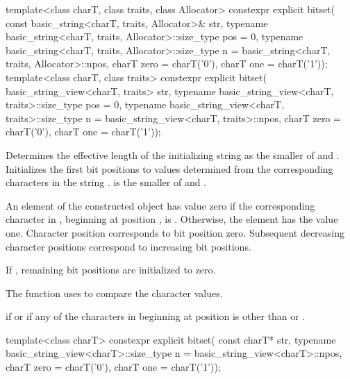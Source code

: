 %
\begin{itemdecl}
template<class charT, class traits, class Allocator>
  constexpr explicit bitset(
    const basic_string<charT, traits, Allocator>& str,
    typename basic_string<charT, traits, Allocator>::size_type pos = 0,
    typename basic_string<charT, traits, Allocator>::size_type n
      = basic_string<charT, traits, Allocator>::npos,
    charT zero = charT('0'),
    charT one = charT('1'));
template<class charT, class traits>
  constexpr explicit bitset(
    basic_string_view<charT, traits> str,
    typename basic_string_view<charT, traits>::size_type pos = 0,
    typename basic_string_view<charT, traits>::size_type n
      = basic_string_view<charT, traits>::npos,
    charT zero = charT('0'),
    charT one = charT('1'));
\end{itemdecl}

\begin{itemdescr}
\pnum
\effects
Determines the effective length
 of the initializing string as the smaller of
 and
.
Initializes the first  bit
positions to values determined from the corresponding characters in the string
.
 is the smaller of  and .

\pnum
An element of the constructed object has value zero if the
corresponding character in , beginning at position
, is
.
Otherwise, the element has the value one.
Character position  corresponds to bit position zero.
Subsequent decreasing character positions correspond to increasing bit positions.

\pnum
If , remaining bit positions are initialized to zero.

\pnum
The function uses 
to compare the character values.

\pnum
\throws
{}%
 if  or
%
 if any of
the  characters in 
beginning at position 
is other than  or .
\end{itemdescr}

%
\begin{itemdecl}
template<class charT>
  constexpr explicit bitset(
    const charT* str,
    typename basic_string_view<charT>::size_type n = basic_string_view<charT>::npos,
    charT zero = charT('0'),
    charT one = charT('1'));
\end{itemdecl}

